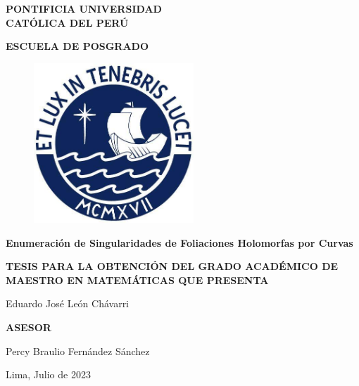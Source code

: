 \begin{center}

\vspace*{0.5cm}

\huge \textsf{\textbf{PONTIFICIA UNIVERSIDAD \\ CATÓLICA DEL PERÚ}}

\vspace*{1cm}

\LARGE \textsf{\textbf{ESCUELA DE POSGRADO}}

\vspace*{1cm}

\begin{figure}[htb]
\begin{center}
\includegraphics[width=6cm]{logo.jpg}
\end{center}
\end{figure}

\vspace*{0.5cm}

\Large \textsf {\textbf{Enumeración de Singularidades de Foliaciones Holomorfas por Curvas}}

\vspace*{0.5cm}

\large \textsf{\textbf{TESIS PARA LA OBTENCIÓN DEL GRADO ACADÉMICO DE MAESTRO EN MATEMÁTICAS QUE PRESENTA}}

\vspace*{1cm}

\textsf{Eduardo José León Chávarri}

\vspace*{1cm}

\textsf{\textbf{ASESOR}}

\vspace*{0.3cm}

\textsf{Percy Braulio Fernández Sánchez}

\vspace*{1cm}

\textsf{Lima, Julio de 2023}

\end{center}
